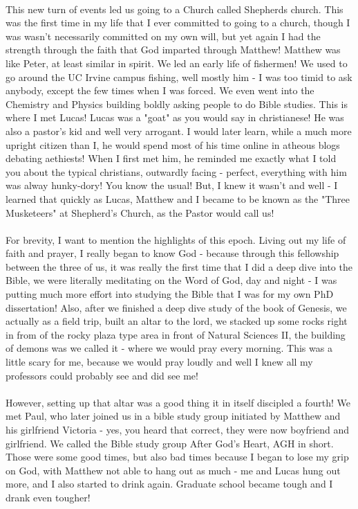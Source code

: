 \documentclass[a4paper]{article}
\begin{document}
\paragraph{}
This new turn of events led us going to a Church called Shepherds church. This was the first time in my life
that I ever committed to going to a church, though I was wasn't necessarily committed on my own will, but
yet again I had the strength through the faith that God imparted through Matthew! Matthew was like Peter, at
least similar in spirit. We led an early life of fishermen! We used to go around the UC Irvine campus
fishing, well mostly him - I was too timid to ask anybody, except the few times when I was forced. We even
went into the Chemistry and Physics building boldly asking people to do Bible studies. This is where I met
Lucas! Lucas was a "goat" as you would say in christianese! He was also a pastor's kid and well very
arrogant. I would later learn, while a much more upright citizen than I, he would spend most of his time
online in atheous blogs debating aethiests! When I first met him, he reminded me exactly what I told you
about the typical christians, outwardly facing - perfect, everything with him was alway hunky-dory! You know
the usual! But, I knew it wasn't and well - I learned that quickly as Lucas, Matthew and I became to be
known as the "Three Musketeers" at Shepherd's Church, as the Pastor would call us!

\paragraph{}
For brevity, I want to mention the highlights of this epoch. Living out my life of faith and prayer, I
really began to know God - because through this fellowship between the three of us, it was really the first
time that I did a deep dive into the Bible, we were literally meditating on the Word of God, day and night -
I was putting much more effort into studying the Bible that I was for my own PhD dissertation! Also, after
we finished a deep dive study of the book of Genesis, we actually as a field trip, built an altar to the
lord, we stacked up some rocks right in from of the rocky plaza type area in front of Natural Sciences II,
the building of demons was we called it - where we would pray every morning. This was a little scary for me,
because we would pray loudly and well I knew all my professors could probably see and did see me!

\paragraph{}
However, setting up that altar was a good thing it in itself discipled a fourth! We met Paul, who later
joined us in a bible study group initiated by Matthew and his girlfriend Victoria - yes, you heard that
correct, they were now boyfriend and girlfriend. We called the Bible study group After God's Heart, AGH in
short. Those were some good times, but also bad times because I began to lose my grip on God, with Matthew
not able to hang out as much - me and Lucas hung out more, and I also started to drink again. Graduate
school became tough and I drank even tougher!
\end{document}
